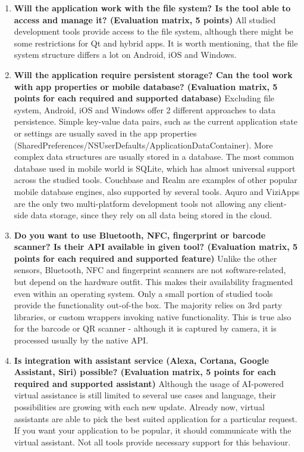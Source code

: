 \documentclass[english,master,public,dept460,male,cpdeclaration,oneside]{diploma}
\begin{document}
\begin{enumerate}
	\item \textbf{Will the application work with the file system? Is the tool able to access and manage it? (Evaluation matrix, 5 points) }
	All studied development tools provide access to the file system, although there might be some restrictions for Qt and hybrid apps. It is worth mentioning, that the file system structure differs a lot on Android, iOS and Windows. 
	
	\item \textbf{Will the application require persistent storage? Can the tool work with app properties or mobile database? (Evaluation matrix, 5 points for each required and supported database) }
	Excluding file system, Android, iOS and Windows offer 2 different approaches to data persistence. Simple key-value data pairs, such as the current application state or settings are usually saved in the app properties (SharedPreferences/NSUserDefaults/ApplicationDataContainer). More complex data structures are usually stored in a database. The most common database used in mobile world is SQLite, which has almost universal support across the studied tools. Couchbase and Realm are examples of other popular mobile database engines, also supported by several tools. Aquro and ViziApps are the only two multi-platform development tools not allowing any client-side data storage, since they rely on all data being stored in the cloud.
	
	\item \textbf{Do you want to use Bluetooth, NFC, fingerprint or barcode scanner? Is their API available in given tool? (Evaluation matrix, 5 points for each required and supported feature) }
	Unlike the other sensors, Bluetooth, NFC and fingerprint scanners are not software-related, but depend on the hardware outfit. This makes their availability fragmented even within an operating system. Only a small portion of studied tools provide the functionality out-of-the box. The majority relies on 3rd party libraries, or custom wrappers invoking native functionality. This is true also for the barcode or QR scanner - although it is captured by camera, it is processed usually by the native API.
	
	\item \textbf{Is integration with assistant service (Alexa, Cortana, Google Assistant, Siri) possible? (Evaluation matrix, 5 points for each required and supported assistant)} 
	Although the usage of AI-powered virtual assistance is still limited to several use cases and language, their possibilities are growing with each new update. Already now, virtual assistants are able to pick the best suited application for a particular request. If you want your application to be popular, it should communicate with the virtual assistant. Not all tools provide necessary support for this behaviour.
	

\end{enumerate}
\end{document}
